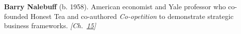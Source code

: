 \textbf{Barry Nalebuff} (b. 1958). American economist and Yale professor who co-founded Honest Tea and co-authored \emph{Co-opetition} to demonstrate strategic business frameworks. \emph{[Ch.~\hyperref[ch:envelopeparadox]{15}]}

